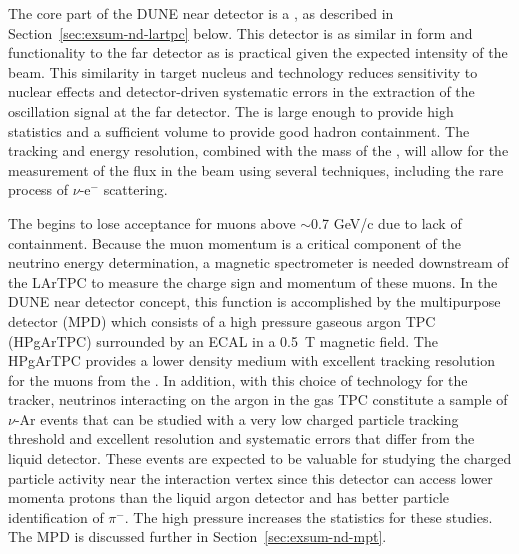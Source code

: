 The core part of the DUNE near detector is a , as described in Section~\ref{sec:exsum-nd-lartpc} below.  This detector is as similar in form and functionality to the far detector as is practical given the expected intensity of the beam.  This similarity in target nucleus and technology reduces sensitivity to nuclear effects and detector-driven systematic errors in the extraction of the oscillation signal at the far detector.  The  is large enough to provide high statistics and a sufficient volume to provide good hadron containment.  The tracking and energy resolution, combined with the mass of the , will allow for the measurement of the flux in the beam using several techniques, including the rare process of $\nu$-e$^{-}$ scattering.

The  begins to lose acceptance for muons above $\sim$0.7 GeV/c due to lack of containment.  Because the muon momentum is a critical component of the neutrino energy determination, a magnetic spectrometer is needed downstream of the LArTPC to measure the charge sign and momentum of these muons.  In the DUNE near detector concept, this function is accomplished by the multipurpose detector (MPD) which consists of a high pressure gaseous argon TPC (HPgArTPC) surrounded by an ECAL in a 0.5~T magnetic field. The HPgArTPC provides a lower density medium with excellent tracking resolution for the muons from the .  In addition, with this choice of technology for the tracker, neutrinos interacting on the argon in the gas TPC constitute a sample of $\nu$-Ar events that can be studied with a very low charged particle tracking threshold and excellent resolution and systematic errors that differ from the liquid detector. These events are expected to be valuable for studying the charged particle activity near the interaction vertex since this detector can access lower momenta protons than the liquid argon detector and has better particle identification of $\pi^{-}$.  
The high pressure increases the statistics for these studies.  
The MPD is  discussed further in Section~\ref{sec:exsum-nd-mpt}.


